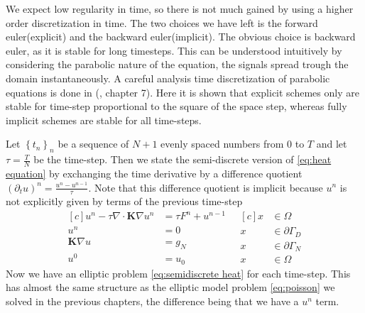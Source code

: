 \documentclass[../Main/main.tex]{subfiles}
\begin{document}
	We expect low regularity in time, so there is not much gained by using a higher order discretization in time. The two choices we have left is the forward euler(explicit) and the backward euler(implicit). The obvious choice is backward euler, as it is stable for long timesteps. This can be understood intuitively by considering the parabolic nature of the equation, the signals spread trough the domain instantaneously. A careful analysis time discretization of parabolic equations is done in (\cite{Knabner}, chapter 7).  Here it is shown that explicit schemes only are stable for time-step proportional to the square of the space step, whereas fully implicit schemes are stable for all time-steps. \par  Let $\left \{ t_n \right \}_n$ be a sequence of $N+1$ evenly spaced numbers from $0$ to $T$ and let $\tau = \frac{T}{N}$ be the time-step. Then we state the semi-discrete version of \eqref{eq:heat equation} by exchanging the time derivative by a difference quotient $(\partial_t u)^n = \frac{u^n-u^{n-1}}{\tau}$. Note that this difference quotient is implicit because $u^n$ is not explicitly given by terms of the previous time-step
	\begin{equation}\label{eq:semidiscrete heat}
		\begin{aligned}[c]
			u^n - \tau \nabla \cdot \pmb{K} \nabla u^n &= \tau F^n+u^{n-1}\\
			u^n &= 0 \\
			\pmb{K}\nabla u &= g_N\\
			u^0 &= u_0
		\end{aligned}
		\ \ \
		\begin{aligned}[c]
			x &\in \Omega  \\
			x &\in \partial \Gamma_D \\
			x &\in \partial \Gamma_N \\
			x &\in \Omega  
		\end{aligned}
	\end{equation}
	Now we have an elliptic problem \eqref{eq:semidiscrete heat} for each time-step. This has almost the same structure as the elliptic model problem \eqref{eq:poisson} we solved in the previous chapters, the difference being that we have a $u^n$ term.
\end{document}
